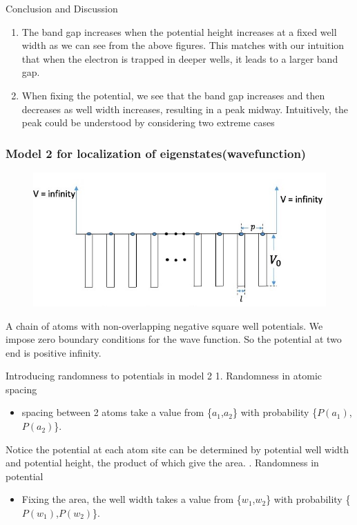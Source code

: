 \documentclass{beamer}
\begin{document}
\begin{frame}{Conclusion and Discussion}

\begin{enumerate}
    \item The band gap increases when the potential height increases at a fixed well width as we can see from the above figures.  This matches with our intuition that when the electron is trapped in deeper wells, it leads to a larger band gap. 
    \item When fixing the potential, we see that the band gap increases and then decreases as well width increases, resulting in a peak midway. 
    Intuitively, the peak could be understood by considering two extreme cases
    
\end{enumerate}


\end{frame}

\begin{frame}
\frametitle{Model 2 for localization of eigenstates(wavefunction)}

\begin{figure}
\includegraphics[width=0.8\linewidth]{square_potential_problem.jpeg}
\end{figure}

A chain of atoms with non-overlapping negative square well potentials. We impose zero boundary conditions for the wave function. So the potential at two end is positive infinity.

\end{frame}

\begin{frame}{Introducing randomness to potentials in model 2}
1. Randomness in atomic spacing
\begin{itemize}
    \item spacing between 2 atoms take a value from \{$a_1$,$a_2$\} with probability  \{$P(a_1)$,$P(a_2)$\}. 
\end{itemize}

Notice the potential at each atom site can be determined by potential well width and potential height, the product of which give the area. 
. Randomness in potential 
\begin{itemize}
    \item Fixing the area, the well width takes a value from \{$w_1$,$w_2$\} with probability  \{$P(w_1)$,$P(w_2)$\}.
\end{itemize}

    
\end{frame}
\end{document}
